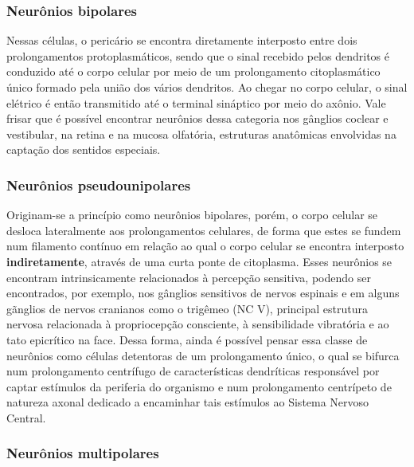 \documentclass[
]{book}
\theoremstyle{definition}
\theoremstyle{definition}
\theoremstyle{definition}
\theoremstyle{definition}
\theoremstyle{remark}
\begin{document}
\hypertarget{neuruxf4nios-bipolares}{%
\subsubsection*{Neurônios bipolares}\label{neuruxf4nios-bipolares}}

Nessas células, o pericário se encontra diretamente interposto entre dois prolongamentos protoplasmáticos, sendo que o sinal recebido pelos dendritos é conduzido até o corpo celular por meio de um prolongamento citoplasmático único formado pela união dos vários dendritos. Ao chegar no corpo celular, o sinal elétrico é então transmitido até o terminal sináptico por meio do axônio. Vale frisar que é possível encontrar neurônios dessa categoria nos gânglios coclear e vestibular, na retina e na mucosa olfatória, estruturas anatômicas envolvidas na captação dos sentidos especiais.

\hypertarget{neuruxf4nios-pseudounipolares}{%
\subsubsection*{Neurônios pseudounipolares}\label{neuruxf4nios-pseudounipolares}}

Originam-se a princípio como neurônios bipolares, porém, o corpo celular se desloca lateralmente aos prolongamentos celulares, de forma que estes se fundem num filamento contínuo em relação ao qual o corpo celular se encontra interposto \textbf{indiretamente}, através de uma curta ponte de citoplasma. Esses neurônios se encontram intrinsicamente relacionados à percepção sensitiva, podendo ser encontrados, por exemplo, nos gânglios sensitivos de nervos espinais e em alguns gãnglios de nervos cranianos como o trigêmeo (NC V), principal estrutura nervosa relacionada à propriocepção consciente, à sensibilidade vibratória e ao tato epicrítico na face. Dessa forma, ainda é possível pensar essa classe de neurônios como células detentoras de um prolongamento único, o qual se bifurca num prolongamento centrífugo de características dendríticas responsável por captar estímulos da periferia do organismo e num prolongamento centrípeto de natureza axonal dedicado a encaminhar tais estímulos ao Sistema Nervoso Central.

\hypertarget{neuruxf4nios-multipolares}{%
\subsubsection*{Neurônios multipolares}\label{neuruxf4nios-multipolares}}
\end{document}
